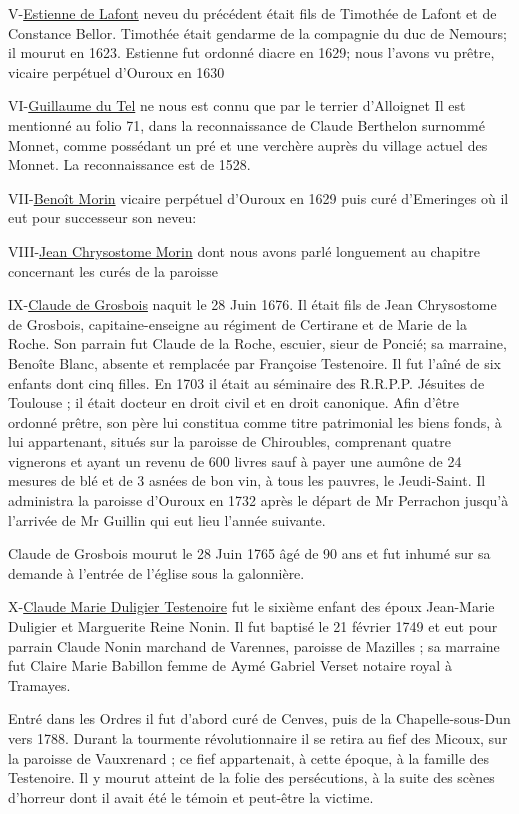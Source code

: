 V-\underline{Estienne de Lafont} neveu du précédent était fils de Timothée de Lafont et de Constance Bellor. Timothée était gendarme de la compagnie du duc de Nemours; il mourut en 1623. Estienne fut ordonné diacre en 1629; nous l'avons vu prêtre, vicaire perpétuel d'Ouroux en 1630

VI-\underline{Guillaume du Tel} ne nous est connu que par le terrier d'Alloignet Il est mentionné au folio 71, dans la reconnaissance de Claude Berthelon surnommé Monnet, comme possédant un pré et une verchère auprès du village actuel des Monnet. La reconnaissance est de 1528.

VII-\underline{Benoît Morin} vicaire perpétuel d'Ouroux en 1629 puis curé d'Emeringes où il eut pour successeur son neveu:

VIII-\underline{Jean Chrysostome Morin} dont nous avons parlé longuement au chapitre concernant les curés de la paroisse

IX-\underline{Claude de Grosbois} naquit le 28 Juin 1676. Il était fils de Jean Chrysostome de Grosbois, capitaine-enseigne au régiment de Certirane et de Marie de la Roche. Son parrain fut Claude de la Roche, escuier, sieur de Poncié; sa marraine, Benoîte Blanc, absente et remplacée par Françoise Testenoire. Il fut l'aîné de six enfants dont cinq filles.
    En 1703 il était au séminaire des R.R.P.P. Jésuites de Toulouse ; il était docteur en droit civil et en droit canonique.
    Afin d'être ordonné prêtre, son père lui constitua comme titre patrimonial les biens fonds, à lui appartenant, situés sur la paroisse de Chiroubles, comprenant quatre vignerons et ayant un revenu de 600 livres
sauf à payer une aumône de 24 mesures de blé et de 3 asnées de bon vin, à tous les pauvres, le Jeudi-Saint. Il administra la paroisse d'Ouroux en 1732 après le départ de Mr Perrachon jusqu'à l'arrivée de Mr Guillin qui eut lieu l'année suivante.

Claude de Grosbois mourut le 28 Juin 1765 âgé de 90 ans et fut inhumé sur sa demande à l'entrée de l'église sous la galonnière.

X-\underline{Claude Marie Duligier Testenoire} fut le sixième enfant des époux Jean-Marie Duligier et Marguerite Reine Nonin. Il fut baptisé le 21 février 1749 et eut pour parrain Claude Nonin marchand de Varennes, paroisse de Mazilles ; sa marraine fut Claire Marie Babillon femme de Aymé Gabriel Verset notaire royal à Tramayes.

Entré dans les Ordres il fut d'abord curé de Cenves, puis de la Chapelle-sous-Dun vers 1788. Durant la tourmente révolutionnaire il se retira au fief des Micoux, sur la paroisse de Vauxrenard ; ce fief appartenait, à cette époque, à la famille des Testenoire. Il y mourut atteint de la folie des persécutions, à la suite des scènes d'horreur dont il avait été le témoin et peut-être la victime.


